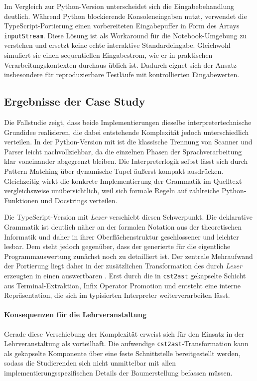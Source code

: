 Im Vergleich zur Python-Version unterscheidet sich die Eingabebehandlung deutlich. Während Python blockierende Konsoleneingaben nutzt, verwendet die TypeScript-Portierung einen vorbereiteten Eingabepuffer in Form des Arrays \texttt{inputStream}. Diese Lösung ist als Workaround für die Notebook-Umgebung zu verstehen und ersetzt keine echte interaktive Standardeingabe. Gleichwohl simuliert sie einen sequentiellen Eingabestrom, wie er in praktischen Verarbeitungskontexten durchaus üblich ist. Dadurch eignet sich der Ansatz insbesondere für reproduzierbare Testläufe mit kontrollierten Eingabewerten.

\subsection{Ergebnisse der Case Study}

Die Fallstudie zeigt, dass beide Implementierungen dieselbe interpretertechnische Grundidee realisieren, die dabei entstehende Komplexität jedoch unterschiedlich verteilen. In der Python-Version mit \emph{} ist die klassische Trennung von Scanner und Parser leicht nachvollziehbar, da die einzelnen Phasen der Sprachverarbeitung klar voneinander abgegrenzt bleiben. Die Interpreterlogik selbst lässt sich durch Pattern Matching über dynamische Tupel äußerst kompakt ausdrücken. Gleichzeitig wirkt die konkrete Implementierung der Grammatik im Quelltext vergleichsweise unübersichtlich, weil sich formale Regeln auf zahlreiche Python-Funktionen und Docstrings verteilen.

Die TypeScript-Version mit \emph{Lezer} verschiebt diesen Schwerpunkt. Die deklarative Grammatik ist deutlich näher an der formalen Notation aus der theoretischen Informatik und daher in ihrer Oberflächenstruktur geschlossener und leichter lesbar. Dem steht jedoch gegenüber, dass der generierte  für die eigentliche Programmauswertung zunächst noch zu detailliert ist. Der zentrale Mehraufwand der Portierung liegt daher in der zusätzlichen Transformation des durch \emph{Lezer} erzeugten  in einen auswertbaren . Erst durch die in \texttt{cst2ast} gekapselte Schicht aus Terminal-Extraktion, Infix Operator Promotion und  entsteht eine interne Repräsentation, die sich im typisierten Interpreter weiterverarbeiten lässt.

\paragraph{Konsequenzen für die Lehrveranstaltung}
Gerade diese Verschiebung der Komplexität erweist sich für den Einsatz in der Lehrveranstaltung als vorteilhaft. Die aufwendige \texttt{cst2ast}-Transformation kann als gekapselte Komponente über eine feste Schnittstelle bereitgestellt werden, sodass die Studierenden sich nicht unmittelbar mit allen implementierungsspezifischen Details der Baumerstellung befassen müssen.

